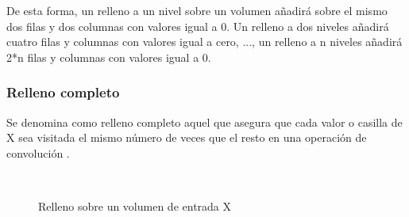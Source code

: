 De esta forma, un relleno a un nivel sobre un volumen añadirá sobre el mismo dos filas y dos columnas con valores igual a 0. Un relleno a dos niveles añadirá cuatro filas y columnas con valores igual a cero, ..., un relleno a n niveles añadirá 2*n filas y columnas con valores igual a 0.

\subsubsection{Relleno completo}

Se denomina como relleno completo aquel que asegura que cada valor o casilla de X sea visitada el mismo número de veces que el resto en una operación de convolución \cite{padding_2}.

\begin{figure}[H]
	\centering
	\hfill
	\\
	\hfill
	\hfill
	
	\caption{Relleno sobre un volumen de entrada X}
\end{figure}

